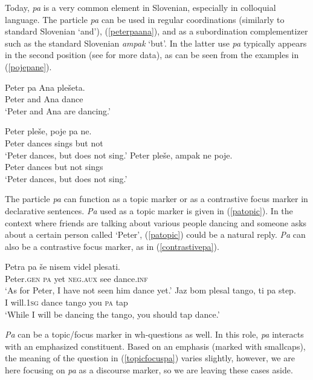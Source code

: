 \documentclass[output=paper,
modfonts,
newtxmath,
hidelinks
]{langscibook}
\begin{document}
Today, \textit{pa} is a very common element in Slovenian, especially in colloquial language. The particle \textit{pa} can be used in regular coordinations (similarly to standard Slovenian `and'), (\ref{peterpaana}), and as a subordination complementizer such as the standard Slovenian \textit{ampak} `but'. In the latter use \textit{pa} typically appears in the second position (see \citealt{marusicetal2011pa} for more data), as can be seen from the examples in (\ref{pojepane}).

\begin{exe}
\ex \label{peterpaana}
\gll Peter 	pa Ana plešeta. \\
	Peter 	and Ana dance\\
\trans  `Peter and Ana are dancing.' 
\ex \label{pojepane}
\begin{xlist}
\ex \gll	Peter pleše, poje pa ne. \\
 		Peter 	dances sings but not\\
\trans `Peter dances, but does not sing.'
\ex \gll 	Peter pleše, ampak ne poje. \\
 	Peter 	dances but not sings\\
 \trans `Peter dances, but does not sing.'
\end{xlist}
\end{exe}

\noindent The particle \textit{pa} can function as a topic marker or as a contrastive focus marker in declarative sentences. \textit{Pa} used as a topic marker is given in (\ref{patopic}). In the context where friends are talking about various people dancing and someone asks about a certain person called `Peter', (\ref{patopic}) could be a natural reply. \textit{Pa} can also be a contrastive focus marker, as in (\ref{contrastivepa}). 

\begin{exe}
\ex \label{patopic}
\gll  Petra 	pa še nisem videl plesati.\\
 	Peter.\textsc{gen} 	\textsc{pa} yet \textsc{neg.aux} see dance.\textsc{inf} \\
\trans   `As for Peter, I have not seen him dance yet.' 
\ex \label{contrastivepa}
\gll Jaz bom plesal tango, ti pa step.\\
 	I will.\textsc{1sg} dance tango you \textsc{pa} tap\\
\trans   `While I will be dancing the tango, you should tap dance.' 
\end{exe}

\noindent \textit{Pa} can be a topic/focus marker in wh-questions as well. In this role, \textit{pa} interacts with an emphasized constituent. Based on an emphasis (marked with smallcaps), the meaning of the question in (\ref{topicfocuspa}) varies slightly, however, we are here focusing on \textit{pa} as a discourse marker, so we are leaving these cases aside.
\end{document}
